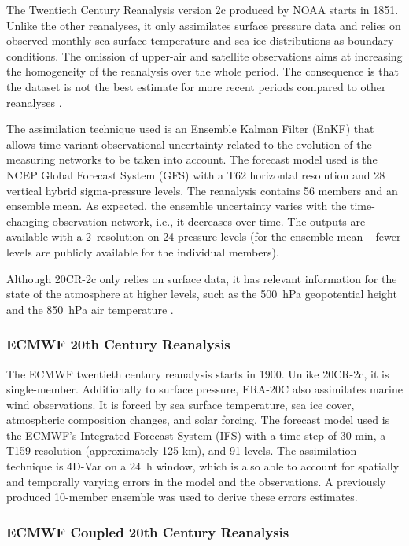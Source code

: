 \documentclass{ametsoc}
\begin{document}
	The Twentieth Century Reanalysis version 2c \citep[20CR-2c --][]{Compo2011} produced by NOAA starts in 1851. Unlike the other reanalyses, it only assimilates surface pressure data and relies on observed monthly sea-surface temperature and sea-ice distributions as boundary conditions. The omission of upper-air and satellite observations aims at increasing the homogeneity of the reanalysis over the whole period. The consequence is that the dataset is not the best estimate for more recent periods compared to other reanalyses \citep{Poli2017}.
	
	The assimilation technique used is an Ensemble Kalman Filter (EnKF) that allows time-variant observational uncertainty related to the evolution of the measuring networks to be taken into account. The forecast model used is the NCEP Global Forecast System (GFS) with a T62 horizontal resolution and 28 vertical hybrid sigma-pressure levels. The reanalysis contains 56 members and an ensemble mean. As expected, the ensemble uncertainty varies with the time-changing observation network, i.e., it decreases over time. The outputs are available with a 2\degree\ resolution on 24 pressure levels (for the ensemble mean -- fewer levels are publicly available for the individual members).
	
	Although 20CR-2c only relies on surface data, it has relevant information for the state of the atmosphere at higher levels, such as the 500~hPa geopotential height and the 850~hPa air temperature \citep{Compo2011}.
	
	
	\subsubsection{ECMWF 20th Century Reanalysis}
	
	The ECMWF twentieth century reanalysis \citep[ERA-20C --][]{Poli2016} starts in 1900. Unlike 20CR-2c, it is single-member. Additionally to surface pressure, ERA-20C also assimilates marine wind observations. It is forced by sea surface temperature, sea ice cover, atmospheric composition changes, and solar forcing. The forecast model used is the ECMWF’s Integrated Forecast System (IFS) with a time step of 30 min, a T159 resolution (approximately 125 km), and 91 levels. The assimilation technique is 4D-Var on a 24~h window, which is also able to account for spatially and temporally varying errors in the model and the observations. A previously produced 10-member ensemble was used to derive these errors estimates.
	
	
	\subsubsection{ECMWF Coupled 20th Century Reanalysis}
	
\end{document}
